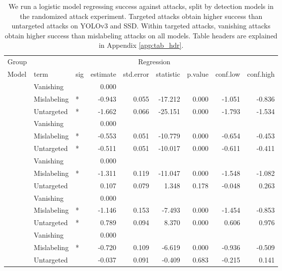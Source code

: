 \begingroup\fontsize{9}{11}\selectfont

\begin{longtable}[t]{lllrrrrrr}
\caption{\label{tab:target_untarget_vanish_mislabel_table}We run a logistic model regressing success against attacks, split by detection models in the randomized attack experiment. Targeted attacks obtain higher success than untargeted attacks on YOLOv3 and SSD. Within targeted attacks, vanishing attacks obtain higher success than mislabeling attacks on all models. Table headers are explained in Appendix \ref{app:tab_hdr}.}\\
\toprule
\multicolumn{1}{c}{Group} & \multicolumn{8}{c}{Regression} \\
\cmidrule(l{3pt}r{3pt}){1-1} \cmidrule(l{3pt}r{3pt}){2-9}
Model & term & sig & estimate & std.error & statistic & p.value & conf.low & conf.high\\
\midrule
 & Vanishing &  & 0.000 &  &  &  &  & \\
\cmidrule{2-9}\nopagebreak
 & Mislabeling & * & -0.943 & 0.055 & -17.212 & 0.000 & -1.051 & -0.836\\
\cmidrule{2-9}\nopagebreak
\multirow{-3}{*}{\raggedright\arraybackslash YOLOv3} & Untargeted & * & -1.662 & 0.066 & -25.151 & 0.000 & -1.793 & -1.534\\
\cmidrule{1-9}\pagebreak[0]
 & Vanishing &  & 0.000 &  &  &  &  & \\
\cmidrule{2-9}\nopagebreak
 & Mislabeling & * & -0.553 & 0.051 & -10.779 & 0.000 & -0.654 & -0.453\\
\cmidrule{2-9}\nopagebreak
\multirow{-3}{*}{\raggedright\arraybackslash SSD} & Untargeted & * & -0.511 & 0.051 & -10.017 & 0.000 & -0.611 & -0.411\\
\cmidrule{1-9}\pagebreak[0]
 & Vanishing &  & 0.000 &  &  &  &  & \\
\cmidrule{2-9}\nopagebreak
 & Mislabeling & * & -1.311 & 0.119 & -11.047 & 0.000 & -1.548 & -1.082\\
\cmidrule{2-9}\nopagebreak
\multirow{-3}{*}{\raggedright\arraybackslash RetinaNet} & Untargeted &  & 0.107 & 0.079 & 1.348 & 0.178 & -0.048 & 0.263\\
\cmidrule{1-9}\pagebreak[0]
 & Vanishing &  & 0.000 &  &  &  &  & \\
\cmidrule{2-9}\nopagebreak
 & Mislabeling & * & -1.146 & 0.153 & -7.493 & 0.000 & -1.454 & -0.853\\
\cmidrule{2-9}\nopagebreak
\multirow{-3}{*}{\raggedright\arraybackslash Faster R-CNN} & Untargeted & * & 0.789 & 0.094 & 8.370 & 0.000 & 0.606 & 0.976\\
\cmidrule{1-9}\pagebreak[0]
 & Vanishing &  & 0.000 &  &  &  &  & \\
\cmidrule{2-9}\nopagebreak
 & Mislabeling & * & -0.720 & 0.109 & -6.619 & 0.000 & -0.936 & -0.509\\
\cmidrule{2-9}\nopagebreak
\multirow{-3}{*}{\raggedright\arraybackslash Cascade R-CNN} & Untargeted &  & -0.037 & 0.091 & -0.409 & 0.683 & -0.215 & 0.141\\
\bottomrule
\end{longtable}
\endgroup{}

